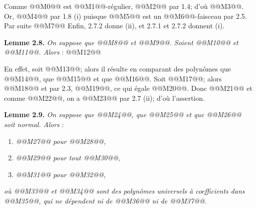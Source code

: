 
Comme @@M0@@ est @@M1@@-régulier, @@M2@@ par 1.4; d'où @@M3@@. Or, @@M4@@ par 1.8 (i) puisque @@M5@@ est un @@M6@@-faisceau par 2.5. Par suite
@@M7@@
Enfin, 2.7.2 donne (ii), et 2.7.1 et 2.7.2 donnent (i).

\textbf{Lemme 2.8.} \emph{On suppose que @@M8@@ et @@M9@@. Soient @@M10@@ et @@M11@@. Alors} :
@@M12@@

En effet, soit @@M13@@; alors il résulte en comparant des polynômes que @@M14@@, que @@M15@@ et que @@M16@@. Soit @@M17@@; alors @@M18@@ et par 2.3, @@M19@@, ce qui égale @@M20@@. Donc @@M21@@ et comme @@M22@@, on a @@M23@@ par 2.7 (ii); d'où l'assertion.

\textbf{Lemme 2.9.} \emph{On suppose que @@M24@@, que @@M25@@ et que @@M26@@ soit normal. Alors} :
\begin{enumerate}[label=(\roman*)]
\item \emph{@@M27@@ pour @@M28@@,}
\item \emph{@@M29@@ pour tout @@M30@@,}
\item \emph{@@M31@@ pour @@M32@@,}
\end{enumerate}
\emph{où @@M33@@ et @@M34@@ sont des polynômes universels à coefficients dans @@M35@@, qui ne dépendent ni de @@M36@@ ni de @@M37@@.}

